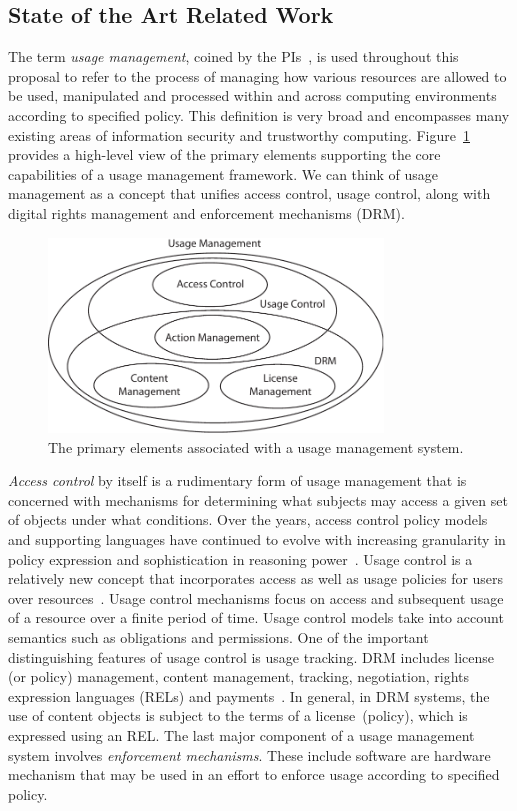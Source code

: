 \documentclass{sbir}
\begin{document}
\subsection{State of the Art Related Work}
The term \emph{usage management}, coined by the PIs~\cite{JaHeLa:10}, is used throughout this proposal to refer to the process of managing how various resources are allowed to be used, manipulated and processed within and across computing environments according to specified policy. This definition is very broad and encompasses many existing areas of information security and trustworthy computing. Figure~\ref{UM} provides a high-level view of the primary elements supporting the core capabilities of a usage management framework. We can think of usage management as a concept that unifies access control, usage control, along with digital rights management and enforcement mechanisms (DRM).
\begin{figure}
  \centerline{\includegraphics[width=3.5in]{./images/usage_management.pdf}}
  \caption{The primary elements associated with a usage management system.}\label{UM}
\end{figure}

\emph{Access control} by itself is a rudimentary form of usage management that is concerned with mechanisms for determining what subjects may access a given set of objects under what conditions. Over the years, access control policy models and supporting languages have continued to evolve with increasing granularity in policy expression and sophistication in reasoning power~\cite{BlPa:76,HuFeKu:06}. Usage control is a relatively new concept that incorporates access as well as usage policies for users over resources~\cite{PaSa:04}. Usage control mechanisms focus on access and subsequent usage of a resource over a finite period of time. Usage control models take into account semantics such as obligations and permissions. One of the important distinguishing features of usage control is usage tracking. DRM includes license (or policy) management, content management, tracking, negotiation, rights expression languages (RELs) and payments~\cite{HeJaKhHr:07,JaHe:08b,JaHeMa:06}. In general, in DRM systems, the use of content objects is subject to the terms of a license~(policy), which is expressed using an REL. The last major component of a usage management system involves \emph{enforcement mechanisms}. These include software are hardware mechanism that may be used in an effort to enforce usage according to specified policy.
\end{document}
